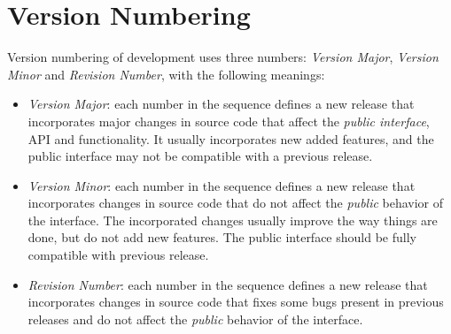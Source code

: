 \documentclass[a4paper]{article}
\begin{document}
\section{Version Numbering}
Version numbering of development uses three numbers: \emph{Version
  Major}, \emph{Version Minor} and \emph{Revision Number}, with the
following meanings: \par{\footnotesize\begin{itemize}%
\item \emph{Version Major}: each number in the sequence defines a new
  release that incorporates major changes in source code that affect
  the \emph{public interface}, API and functionality. It usually
  incorporates new added features, and the public interface may not be
  compatible with a previous release.
\item \emph{Version Minor}: each number in the sequence defines a new
  release that incorporates changes in source code that do not affect
  the \emph{public} behavior of the interface. The incorporated
  changes usually improve the way things are done, but do not add new
  features. The public interface should be fully compatible with
  previous release.
\item \emph{Revision Number}: each number in the sequence defines a
  new release that incorporates changes in source code that fixes some
  bugs present in previous releases and do not affect the
  \emph{public} behavior of the interface.
\end{itemize}}%
\vspace*{\fill}\noindent
\end{document}

